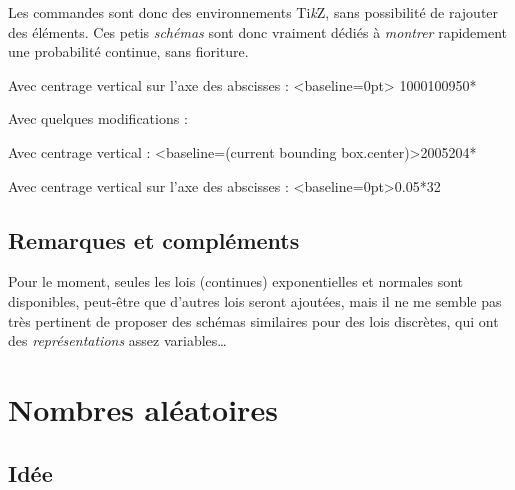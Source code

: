 \documentclass[a4paper,french,11pt]{article}
\providecommand\tikzlogo{Ti\textit{k}Z}
\let\TikZ\tikzlogo
\begin{document}
\begin{noteblock}
Les commandes sont donc des environnements \TikZ, sans possibilité de \og rajouter \fg{} des éléments. Ces petis \textit{schémas} sont donc vraiment dédiés à \textit{montrer} rapidement une probabilité continue, sans fioriture.
\end{noteblock}

\begin{PresCodePL}{}
Avec centrage vertical sur l'axe des abscisses :
\LoiNormaleGraphe
	[AfficheM=false,CouleurCourbe=Blue,CouleurAire=LightBlue]<baseline=0pt>%
	{1000}{100}{950}{*}
\end{PresCodePL}

\begin{PresCodePL}{}
Avec quelques modifications :


\medskip

Avec centrage vertical :
\LoiNormaleGraphe[Largeur=5,Hauteur=2.5]<baseline=(current bounding box.center)>{200}{5}{204}{*}

\medskip

Avec centrage vertical sur l'axe des abscisses :
\LoiExpoGraphe
	[AfficheM=false,CouleurCourbe=Blue,CouleurAire=LightBlue]<baseline=0pt>{0.05}{*}{32}

\medskip

\end{PresCodePL}

\subsection{Remarques et compléments}

\begin{noteblock}
Pour le moment, seules les lois (continues) exponentielles et normales sont disponibles, peut-être que d'autres lois seront ajoutées, mais il ne me semble pas très pertinent de proposer des schémas similaires pour des lois discrètes, qui ont des \textit{représentations} assez variables\ldots
\end{noteblock}

\newpage

\section{Nombres aléatoires}\label{entiersaleatoires}

\subsection{Idée}
\end{document}
